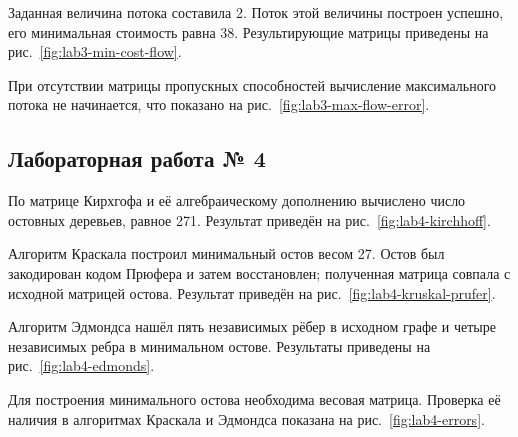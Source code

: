 
Заданная величина потока составила 2. Поток этой величины построен успешно, его минимальная стоимость равна 38. Результирующие матрицы приведены на рис.~\ref{fig:lab3-min-cost-flow}.


При отсутствии матрицы пропускных способностей вычисление максимального потока не начинается, что показано на рис.~\ref{fig:lab3-max-flow-error}.


\subsection{Лабораторная работа № 4}

По матрице Кирхгофа и её алгебраическому дополнению вычислено число остовных деревьев, равное 271. Результат приведён на рис.~\ref{fig:lab4-kirchhoff}.


Алгоритм Краскала построил минимальный остов весом 27. Остов был закодирован кодом Прюфера и затем восстановлен; полученная матрица совпала с исходной матрицей остова. Результат приведён на рис.~\ref{fig:lab4-kruskal-prufer}.


Алгоритм Эдмондса нашёл пять независимых рёбер в исходном графе и четыре независимых ребра в минимальном остове. Результаты приведены на рис.~\ref{fig:lab4-edmonds}.


Для построения минимального остова необходима весовая матрица. Проверка её наличия в алгоритмах Краскала и Эдмондса показана на рис.~\ref{fig:lab4-errors}.


